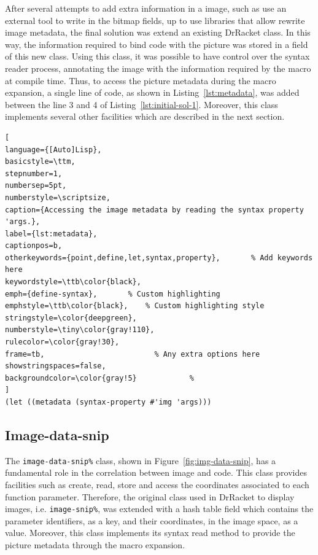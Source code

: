 After several attempts to add extra information in a image, such as use an external tool to write in the bitmap fields, up to use libraries that allow rewrite image metadata, the final solution was extend an existing DrRacket class. In this way, the information required to bind code with the picture was stored in a field of this new class. Using this class, it was possible to have control over the syntax reader process, annotating the image with the information required by the macro at compile time. Thus, to access the picture metadata during the macro expansion, a single line of code, as shown in Listing~\ref{lst:metadata}, was added between the line 3 and 4 of Listing~\ref{lst:initial-sol-1}. Moreover, this class implements several other facilities which are described in the next section. \\

\begin{lstlisting}[
language={[Auto]Lisp},
basicstyle=\ttm,
stepnumber=1,
numbersep=5pt,                   
numberstyle=\scriptsize, 
caption={Accessing the image metadata by reading the syntax property 'args.},
label={lst:metadata},
captionpos=b, 
otherkeywords={point,define,let,syntax,property},       % Add keywords here
keywordstyle=\ttb\color{black},
emph={define-syntax},       % Custom highlighting
emphstyle=\ttb\color{black},    % Custom highlighting style
stringstyle=\color{deepgreen},
numberstyle=\tiny\color{gray!110},
rulecolor=\color{gray!30},
frame=tb,                         % Any extra options here
showstringspaces=false,
backgroundcolor=\color{gray!5}            % 
]
(let ((metadata (syntax-property #'img 'args)))
\end{lstlisting}

\subsection{Image-data-snip}

The \texttt{image-data-snip\%} class, shown in Figure~\ref{fig:img-data-snip}, has a fundamental role in the correlation between image and code. This class provides facilities such as create, read, store and access the coordinates associated to each function parameter. Therefore, the original class used in DrRacket to display images, i.e. \texttt{image-snip\%}, was extended with a hash table field which contains the parameter identifiers, as a key, and their coordinates, in the image space, as a value. Moreover, this class implements its syntax read method to provide the picture metadata through the macro expansion.

